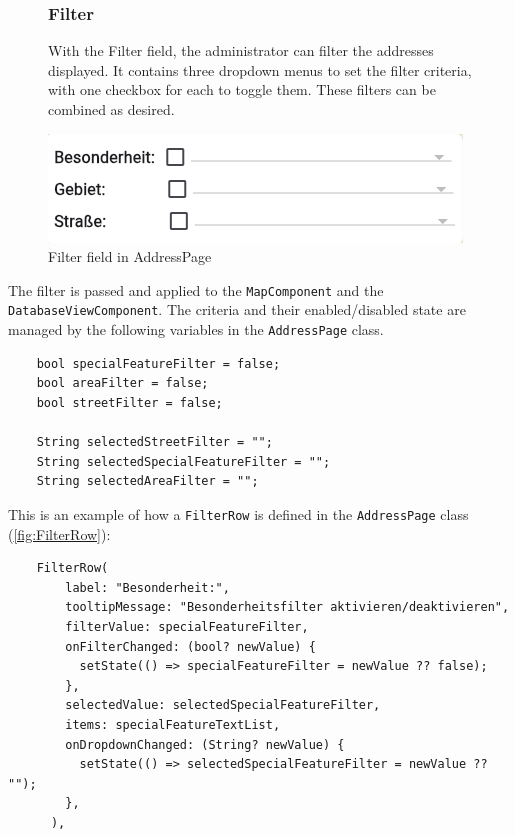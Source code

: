 \begin{figure}[H]
    \centering
    \begin{minipage}{0.55\textwidth} %
        \subsubsection{Filter}
        With the Filter field, the administrator can filter the addresses displayed. It contains three dropdown menus to set the filter criteria, with one checkbox for each to toggle them. These filters can be combined as desired. 
    \end{minipage}
    \hfill 
    \begin{minipage}{0.4\textwidth} %
        \centering
        \includegraphics[width=\linewidth]{images/AdminPanel/FilterField.png}
        \caption{Filter field in AddressPage}
        \label{fig:adminpanel_filter}
    \end{minipage}
\end{figure}

The filter is passed and applied to the \texttt{MapComponent} and the \texttt{DatabaseViewComponent}. The criteria and their enabled/disabled state are managed by the following variables in the \texttt{AddressPage} class.
\lstset{style=mycsharp, caption=Filter variables in AddressPage}
\begin{lstlisting}
    bool specialFeatureFilter = false;
    bool areaFilter = false;
    bool streetFilter = false;
    
    String selectedStreetFilter = "";
    String selectedSpecialFeatureFilter = "";
    String selectedAreaFilter = "";
\end{lstlisting}

This is an example of how a \texttt{FilterRow} is defined in the \texttt{AddressPage} class (\ref{fig:FilterRow}):
\lstset{style=mycsharp, caption=FilterRow in AddressPage}
\begin{lstlisting}
    FilterRow(
        label: "Besonderheit:",
        tooltipMessage: "Besonderheitsfilter aktivieren/deaktivieren",
        filterValue: specialFeatureFilter,
        onFilterChanged: (bool? newValue) {
          setState(() => specialFeatureFilter = newValue ?? false);
        },
        selectedValue: selectedSpecialFeatureFilter,
        items: specialFeatureTextList,
        onDropdownChanged: (String? newValue) {
          setState(() => selectedSpecialFeatureFilter = newValue ?? "");
        },
      ),
\end{lstlisting}




